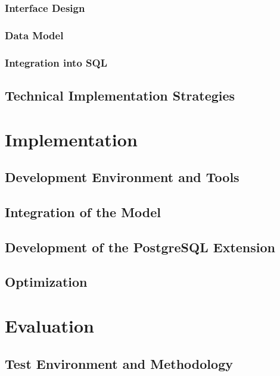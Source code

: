 \documentclass{article}
\begin{document}
\subsubsection{Interface Design}
\subsubsection{Data Model}
\subsubsection{Integration into SQL}

\subsection{Technical Implementation Strategies}

\newpage

\section{Implementation}

\subsection{Development Environment and Tools}

\subsection{Integration of the Model}


\subsection{Development of the PostgreSQL Extension}


\subsection{Optimization}

\newpage

\section{Evaluation}


\subsection{Test Environment and Methodology}
\end{document}
